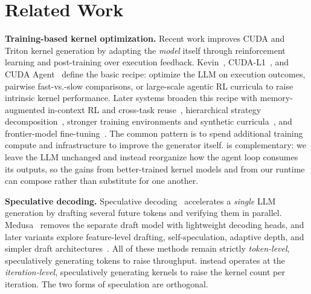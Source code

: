 \section{Related Work}\label{sec:related}

\noindent\textbf{Training-based kernel optimization.}
Recent work improves CUDA and Triton kernel generation by adapting the \emph{model} itself through reinforcement learning and post-training
over execution feedback.
Kevin~\cite{kevin32b}, CUDA-L1~\cite{cudal1}, and CUDA Agent~\cite{cudaagent} define the basic recipe: optimize the LLM on execution outcomes,
pairwise fast-vs.-slow comparisons, or large-scale agentic RL curricula to raise intrinsic kernel performance.
Later systems broaden this recipe with memory-augmented in-context RL and cross-task reuse~\cite{kernelblaster}, 
hierarchical strategy decomposition~\cite{qimengkernel,tritonrl}, stronger training environments and synthetic 
curricula~\cite{drkernel,drtriton}, and frontier-model fine-tuning~\cite{gpt5kernelgen}.
The common pattern is to spend additional training compute and infrastructure to improve the generator itself.
\sysname{} is complementary: we leave the LLM unchanged and instead reorganize how the agent loop consumes its
outputs, so the gains from better-trained kernel models and from our runtime can compose rather than substitute for one another.

\noindent\textbf{Speculative decoding.}
Speculative decoding~\cite{specdec,specsample} accelerates a \emph{single} LLM generation by drafting several
future tokens and verifying them in parallel. Medusa~\cite{medusa} removes the separate draft model with lightweight
decoding heads, and later variants explore feature-level drafting, self-speculation, adaptive depth, and simpler draft architectures~\cite{eagle,hydra,kangaroo,swiftspecdec,ddd,beagle}.
All of these methods remain strictly \emph{token-level}, speculatively generating tokens to raise throughput.
\sysname{} instead operates at the \emph{iteration-level}, speculatively generating kernels to raise the kernel count per iteration.
The two forms of speculation are orthogonal.